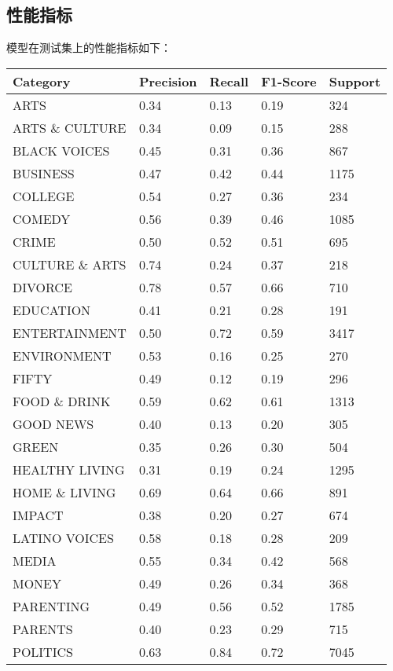 \documentclass{article}
\begin{document}
\subsection{性能指标}

模型在测试集上的性能指标如下：

\begin{table}[h]
    \centering
    \begin{tabular}{|l|l|l|l|l|}
    \hline
    Category & Precision & Recall & F1-Score & Support \\
    \hline
    ARTS & 0.34 & 0.13 & 0.19 & 324 \\
    ARTS \& CULTURE & 0.34 & 0.09 & 0.15 & 288 \\
    BLACK VOICES & 0.45 & 0.31 & 0.36 & 867 \\
    BUSINESS & 0.47 & 0.42 & 0.44 & 1175 \\
    COLLEGE & 0.54 & 0.27 & 0.36 & 234 \\
    COMEDY & 0.56 & 0.39 & 0.46 & 1085 \\
    CRIME & 0.50 & 0.52 & 0.51 & 695 \\
    CULTURE \& ARTS & 0.74 & 0.24 & 0.37 & 218 \\
    DIVORCE & 0.78 & 0.57 & 0.66 & 710 \\
    EDUCATION & 0.41 & 0.21 & 0.28 & 191 \\
    ENTERTAINMENT & 0.50 & 0.72 & 0.59 & 3417 \\
    ENVIRONMENT & 0.53 & 0.16 & 0.25 & 270 \\
    FIFTY & 0.49 & 0.12 & 0.19 & 296 \\
    FOOD \& DRINK & 0.59 & 0.62 & 0.61 & 1313 \\
    GOOD NEWS & 0.40 & 0.13 & 0.20 & 305 \\
    GREEN & 0.35 & 0.26 & 0.30 & 504 \\
    HEALTHY LIVING & 0.31 & 0.19 & 0.24 & 1295 \\
    HOME \& LIVING & 0.69 & 0.64 & 0.66 & 891 \\
    IMPACT & 0.38 & 0.20 & 0.27 & 674 \\
    LATINO VOICES & 0.58 & 0.18 & 0.28 & 209 \\
    MEDIA & 0.55 & 0.34 & 0.42 & 568 \\
    MONEY & 0.49 & 0.26 & 0.34 & 368 \\
    PARENTING & 0.49 & 0.56 & 0.52 & 1785 \\
    PARENTS & 0.40 & 0.23 & 0.29 & 715 \\
    POLITICS & 0.63 & 0.84 & 0.72 & 7045 \\

\end{tabular}
\end{table}
\end{document}
